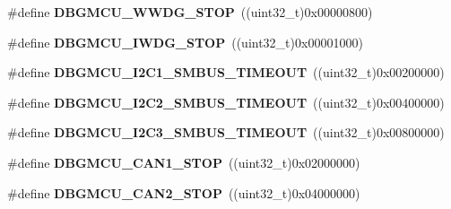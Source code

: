 \begin{DoxyCompactItemize}
\item 
\hypertarget{group___d_b_g_m_c_u___exported___constants_ga9ecfb95a943e2ad165395fff4fa12770}{\#define {\bfseries D\-B\-G\-M\-C\-U\-\_\-\-W\-W\-D\-G\-\_\-\-S\-T\-O\-P}~((uint32\-\_\-t)0x00000800)}\label{group___d_b_g_m_c_u___exported___constants_ga9ecfb95a943e2ad165395fff4fa12770}

\item 
\hypertarget{group___d_b_g_m_c_u___exported___constants_ga5b8b38b5589a2e26a57325553b5dfe23}{\#define {\bfseries D\-B\-G\-M\-C\-U\-\_\-\-I\-W\-D\-G\-\_\-\-S\-T\-O\-P}~((uint32\-\_\-t)0x00001000)}\label{group___d_b_g_m_c_u___exported___constants_ga5b8b38b5589a2e26a57325553b5dfe23}

\item 
\hypertarget{group___d_b_g_m_c_u___exported___constants_ga1c0566af96833376cf1af98449cc914b}{\#define {\bfseries D\-B\-G\-M\-C\-U\-\_\-\-I2\-C1\-\_\-\-S\-M\-B\-U\-S\-\_\-\-T\-I\-M\-E\-O\-U\-T}~((uint32\-\_\-t)0x00200000)}\label{group___d_b_g_m_c_u___exported___constants_ga1c0566af96833376cf1af98449cc914b}

\item 
\hypertarget{group___d_b_g_m_c_u___exported___constants_ga316f8eba36b7a796dd3c6b7d6640b4bf}{\#define {\bfseries D\-B\-G\-M\-C\-U\-\_\-\-I2\-C2\-\_\-\-S\-M\-B\-U\-S\-\_\-\-T\-I\-M\-E\-O\-U\-T}~((uint32\-\_\-t)0x00400000)}\label{group___d_b_g_m_c_u___exported___constants_ga316f8eba36b7a796dd3c6b7d6640b4bf}

\item 
\hypertarget{group___d_b_g_m_c_u___exported___constants_ga95644fa7972fb0b437c77dd98ea1e136}{\#define {\bfseries D\-B\-G\-M\-C\-U\-\_\-\-I2\-C3\-\_\-\-S\-M\-B\-U\-S\-\_\-\-T\-I\-M\-E\-O\-U\-T}~((uint32\-\_\-t)0x00800000)}\label{group___d_b_g_m_c_u___exported___constants_ga95644fa7972fb0b437c77dd98ea1e136}

\item 
\hypertarget{group___d_b_g_m_c_u___exported___constants_ga5ef70e050d1a95f350b6585336a55ca8}{\#define {\bfseries D\-B\-G\-M\-C\-U\-\_\-\-C\-A\-N1\-\_\-\-S\-T\-O\-P}~((uint32\-\_\-t)0x02000000)}\label{group___d_b_g_m_c_u___exported___constants_ga5ef70e050d1a95f350b6585336a55ca8}

\item 
\hypertarget{group___d_b_g_m_c_u___exported___constants_gace53677f1b7b9a52b592cf2b0f3f7178}{\#define {\bfseries D\-B\-G\-M\-C\-U\-\_\-\-C\-A\-N2\-\_\-\-S\-T\-O\-P}~((uint32\-\_\-t)0x04000000)}\label{group___d_b_g_m_c_u___exported___constants_gace53677f1b7b9a52b592cf2b0f3f7178}


\end{DoxyCompactItemize}
